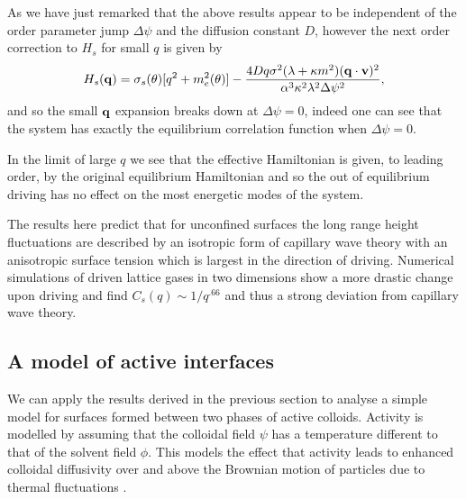 As we have just remarked  that the above results appear to be independent of the order parameter jump $\Delta \psi$ and the diffusion constant $D$, however the next order correction to $H_s$ for small $q$ is given by
\begin{equation}
    H_s({\bf q}) = \sigma_s(\theta) [q^2 + m^2_e(\theta)] - \frac{4Dq \sigma^2(\lambda+\kappa m^2)( {\bf q}\cdot{\bf v})^2 }{\alpha^3 \kappa^2 \lambda^2 \Delta\psi^2},
\end{equation}
and so the small ${\bf q}$ expansion  breaks down at $\Delta\psi=0$, indeed one can see that the system has exactly the equilibrium correlation function when  $\Delta\psi=0$. 

In the limit of large $q$ we see that the effective Hamiltonian is given, to leading order, by the original equilibrium Hamiltonian and so the out of equilibrium driving has no effect on the most energetic modes of the system.

The results here predict that for unconfined surfaces the long range height fluctuations are described by an isotropic form of capillary wave theory with 
an anisotropic surface tension which is largest in the direction of driving. Numerical simulations of driven lattice gases in two dimensions \cite{leung_anomalous_1993} show a more drastic change upon driving and find $C_s(q)\sim  1/q^{.66}$ and thus a strong deviation from capillary wave theory.  

    \subsection{A model of active interfaces}

We can apply the results derived in the previous section to analyse a simple model for
surfaces formed between two phases of active colloids. Activity is modelled by assuming that the colloidal field $\psi$ has a temperature different to that of  the solvent field $\phi$. This models the effect that activity leads to enhanced colloidal diffusivity over and
above the Brownian motion of particles due to thermal fluctuations \cite{grosberg_nonequilibrium_2015}.

